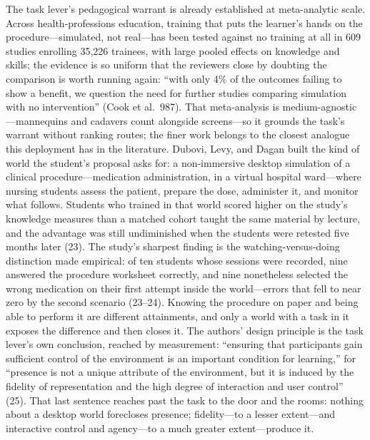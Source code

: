The task lever's pedagogical warrant is already established at
meta-analytic scale. Across health-professions education, training
that puts the learner's hands on the procedure---simulated, not
real---has been tested against no training at all in 609 studies
enrolling 35,226 trainees, with large pooled effects on knowledge and
skills; the evidence is so uniform that the reviewers close by
doubting the comparison is worth running again: ``with only 4\% of the
outcomes failing to show a benefit, we question the need for further
studies comparing simulation with no intervention'' (Cook et al.\
987). That meta-analysis is medium-agnostic---mannequins and cadavers
count alongside screens---so it grounds the task's warrant without
ranking routes; the finer work belongs to the closest analogue this
deployment has in the literature. Dubovi, Levy, and Dagan built the
kind of world the student's proposal asks for: a non-immersive desktop
simulation of a clinical procedure---medication administration, in a
virtual hospital ward---where nursing students assess the patient,
prepare the dose, administer it, and monitor what follows. Students
who trained in that world scored higher on the study's knowledge
measures than a matched cohort taught the same material by lecture, and
the advantage was still undiminished when the students were retested
five months later (23). The study's sharpest
finding is the watching-versus-doing distinction made empirical: of
ten students whose sessions were recorded, nine answered the procedure
worksheet correctly, and nine nonetheless selected the wrong
medication on their first attempt inside the world---errors that fell
to near zero by the second scenario (23--24). Knowing the procedure on
paper and being able to perform it are different attainments, and only
a world with a task in it exposes the difference and then closes it.
The authors' design principle is the task lever's own conclusion,
reached by measurement: ``ensuring that participants gain sufficient
control of the environment is an important condition for learning,''
for ``presence is not a unique attribute of the environment, but it is
induced by the fidelity of representation and the high degree of
interaction and user control'' (25). That last sentence reaches past
the task to the door and the rooms: nothing about a desktop world
forecloses presence; fidelity---to a lesser extent---and interactive
control and agency---to a much greater extent---produce it.

